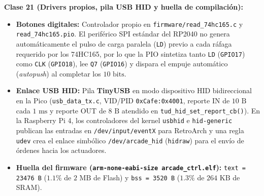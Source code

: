 \textbf{Clase 21 (Drivers propios, pila USB HID y huella de compilación):}
\begin{itemize}
	\item \textbf{Botones digitales:} Controlador propio en \texttt{firmware/read\_74hc165.c} y \texttt{read\_74hc165.pio}. El periférico SPI estándar del RP2040 no genera automáticamente el pulso de carga paralela (\texttt{LD}) previo a cada ráfaga requerido por los 74HC165, por lo que la PIO sintetiza tanto \texttt{LD} (\texttt{GPIO17}) como \texttt{CLK} (\texttt{GPIO18}), lee \texttt{Q7} (\texttt{GPIO16}) y dispara el empuje automático (\textit{autopush}) al completar los $10\text{ bits}$.
	\item \textbf{Enlace USB HID:} Pila \textbf{TinyUSB} en modo dispositivo HID bidireccional en la Pico (\texttt{usb\_data\_tx.c}, VID/PID \texttt{0xCafe:0x4001}, reporte IN de $10\text{ B}$ cada $1\text{ ms}$ y reporte OUT de $8\text{ B}$ atendido en \texttt{tud\_hid\_set\_report\_cb()}). En la Raspberry Pi 4, los controladores del kernel \texttt{usbhid} e \texttt{hid-generic} publican las entradas en \texttt{/dev/input/eventX} para RetroArch y una regla \texttt{udev} crea el enlace simbólico \texttt{/dev/arcade\_hid} (\texttt{hidraw}) para el envío de órdenes hacia los actuadores.
	\item \textbf{Huella del firmware (\texttt{arm-none-eabi-size arcade\_ctrl.elf}):} \texttt{text = 23476 B} ($1.1\%$ de $2\text{ MB}$ de Flash) y \texttt{bss = 3520 B} ($1.3\%$ de $264\text{ KB}$ de SRAM).
\end{itemize}
